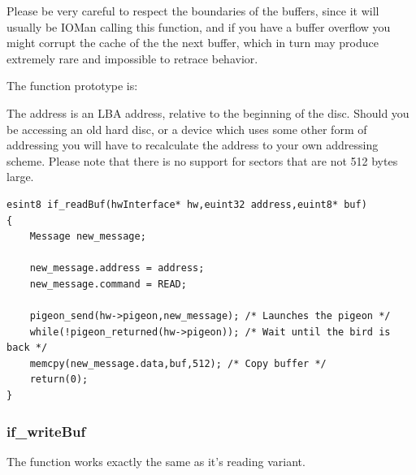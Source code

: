Please be very careful to respect the boundaries of the buffers, since it will usually be IOMan
calling this function, and if you have a buffer overflow you might corrupt the cache of the
the next buffer, which in turn may produce extremely rare and impossible to retrace behavior.

The function prototype is:\\

The address is an LBA address, relative to the beginning of the disc. Should you be
accessing an old hard disc, or a device which uses some other form of addressing you will have to
recalculate the address to your own addressing scheme. Please note that there is no support
for sectors that are not 512 bytes large.

\begin{lstlisting}
esint8 if_readBuf(hwInterface* hw,euint32 address,euint8* buf)
{
	Message new_message;

	new_message.address = address;
	new_message.command = READ;

	pigeon_send(hw->pigeon,new_message); /* Launches the pigeon */
	while(!pigeon_returned(hw->pigeon)); /* Wait until the bird is back */
	memcpy(new_message.data,buf,512); /* Copy buffer */
	return(0);
}
\end{lstlisting}

\subsubsection{if\_writeBuf}
The function  works exactly the same as it's reading variant.
